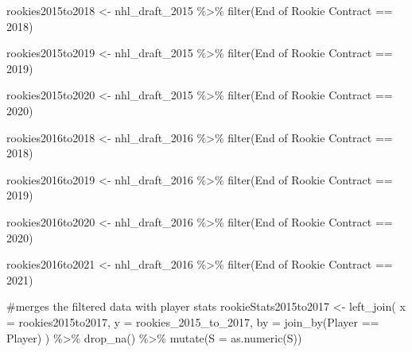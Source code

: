 \documentclass[
  letterpaper,
  DIV=11,
  numbers=noendperiod]{scrartcl}
\newenvironment{Shaded}{\begin{snugshade}}{\end{snugshade}}
\newcommand{\AttributeTok}[1]{\textcolor[rgb]{0.40,0.45,0.13}{#1}}
\newcommand{\CommentTok}[1]{\textcolor[rgb]{0.37,0.37,0.37}{#1}}
\newcommand{\DecValTok}[1]{\textcolor[rgb]{0.68,0.00,0.00}{#1}}
\newcommand{\FunctionTok}[1]{\textcolor[rgb]{0.28,0.35,0.67}{#1}}
\newcommand{\NormalTok}[1]{\textcolor[rgb]{0.00,0.23,0.31}{#1}}
\newcommand{\OtherTok}[1]{\textcolor[rgb]{0.00,0.23,0.31}{#1}}
\newcommand{\SpecialCharTok}[1]{\textcolor[rgb]{0.37,0.37,0.37}{#1}}
\newcommand{\StringTok}[1]{\textcolor[rgb]{0.13,0.47,0.30}{#1}}
\begin{document}
\begin{Shaded}
\begin{Highlighting}[]
\NormalTok{rookies2015to2018 }\OtherTok{\textless{}{-}}\NormalTok{ nhl\_draft\_2015 }\SpecialCharTok{\%\textgreater{}\%}
  \FunctionTok{filter}\NormalTok{(}\StringTok{\textasciigrave{}}\AttributeTok{End of Rookie Contract}\StringTok{\textasciigrave{}} \SpecialCharTok{==} \DecValTok{2018}\NormalTok{)}

\NormalTok{rookies2015to2019 }\OtherTok{\textless{}{-}}\NormalTok{ nhl\_draft\_2015 }\SpecialCharTok{\%\textgreater{}\%}
  \FunctionTok{filter}\NormalTok{(}\StringTok{\textasciigrave{}}\AttributeTok{End of Rookie Contract}\StringTok{\textasciigrave{}} \SpecialCharTok{==} \DecValTok{2019}\NormalTok{)}

\NormalTok{rookies2015to2020 }\OtherTok{\textless{}{-}}\NormalTok{ nhl\_draft\_2015 }\SpecialCharTok{\%\textgreater{}\%}
  \FunctionTok{filter}\NormalTok{(}\StringTok{\textasciigrave{}}\AttributeTok{End of Rookie Contract}\StringTok{\textasciigrave{}} \SpecialCharTok{==} \DecValTok{2020}\NormalTok{)}

\NormalTok{rookies2016to2018 }\OtherTok{\textless{}{-}}\NormalTok{ nhl\_draft\_2016 }\SpecialCharTok{\%\textgreater{}\%}
  \FunctionTok{filter}\NormalTok{(}\StringTok{\textasciigrave{}}\AttributeTok{End of Rookie Contract}\StringTok{\textasciigrave{}} \SpecialCharTok{==} \DecValTok{2018}\NormalTok{)}

\NormalTok{rookies2016to2019 }\OtherTok{\textless{}{-}}\NormalTok{ nhl\_draft\_2016 }\SpecialCharTok{\%\textgreater{}\%}
  \FunctionTok{filter}\NormalTok{(}\StringTok{\textasciigrave{}}\AttributeTok{End of Rookie Contract}\StringTok{\textasciigrave{}} \SpecialCharTok{==} \DecValTok{2019}\NormalTok{)}

\NormalTok{rookies2016to2020 }\OtherTok{\textless{}{-}}\NormalTok{ nhl\_draft\_2016 }\SpecialCharTok{\%\textgreater{}\%}
  \FunctionTok{filter}\NormalTok{(}\StringTok{\textasciigrave{}}\AttributeTok{End of Rookie Contract}\StringTok{\textasciigrave{}} \SpecialCharTok{==} \DecValTok{2020}\NormalTok{)}

\NormalTok{rookies2016to2021 }\OtherTok{\textless{}{-}}\NormalTok{ nhl\_draft\_2016 }\SpecialCharTok{\%\textgreater{}\%}
  \FunctionTok{filter}\NormalTok{(}\StringTok{\textasciigrave{}}\AttributeTok{End of Rookie Contract}\StringTok{\textasciigrave{}} \SpecialCharTok{==} \DecValTok{2021}\NormalTok{)}

\CommentTok{\#merges the filtered data with player stats}
\NormalTok{rookieStats2015to2017 }\OtherTok{\textless{}{-}} \FunctionTok{left\_join}\NormalTok{(}
  \AttributeTok{x =}\NormalTok{ rookies2015to2017,}
  \AttributeTok{y =}\NormalTok{ rookies\_2015\_to\_2017,}
  \AttributeTok{by =} \FunctionTok{join\_by}\NormalTok{(Player }\SpecialCharTok{==}\NormalTok{ Player)}
\NormalTok{) }\SpecialCharTok{\%\textgreater{}\%}
  \FunctionTok{drop\_na}\NormalTok{() }\SpecialCharTok{\%\textgreater{}\%}
  \FunctionTok{mutate}\NormalTok{(}\AttributeTok{S =} \FunctionTok{as.numeric}\NormalTok{(S))}


\end{Highlighting}
\end{Shaded}
\end{document}
